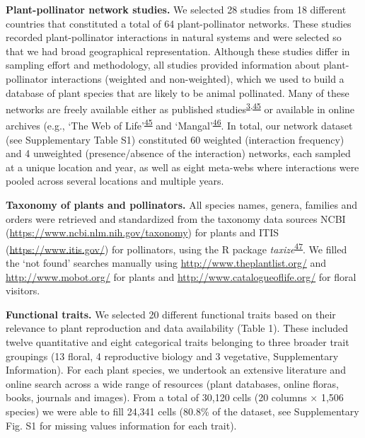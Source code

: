\documentclass[12pt,a4paper,]{article}
\begin{document}
\textbf{Plant-pollinator network studies.} We selected 28 studies from
18 different countries that constituted a total of 64 plant-pollinator
networks. These studies recorded plant-pollinator interactions in
natural systems and were selected so that we had broad geographical
representation. Although these studies differ in sampling effort and
methodology, all studies provided information about plant-pollinator
interactions (weighted and non-weighted), which we used to build a
database of plant species that are likely to be animal pollinated. Many
of these networks are freely available either as published
studies\textsuperscript{\protect\hyperlink{ref-carvalheiro2014}{3},\protect\hyperlink{ref-fortuna2010}{45}}
or available in online archives (e.g., `The Web of
Life'\textsuperscript{\protect\hyperlink{ref-fortuna2010}{45}} and
`Mangal'\textsuperscript{\protect\hyperlink{ref-poisot2016}{46}}. In
total, our network dataset (see Supplementary Table S1) constituted 60
weighted (interaction frequency) and 4 unweighted (presence/absence of
the interaction) networks, each sampled at a unique location and year,
as well as eight meta-webs where interactions were pooled across several
locations and multiple years.

\textbf{Taxonomy of plants and pollinators.} All species names, genera,
families and orders were retrieved and standardized from the taxonomy
data sources NCBI (\url{https://www.ncbi.nlm.nih.gov/taxonomy}) for
plants and ITIS (\url{https://www.itis.gov/}) for pollinators, using the
R package
\emph{taxize}\textsuperscript{\protect\hyperlink{ref-chamberlain2020}{47}}.
We filled the `not found' searches manually using
\url{http://www.theplantlist.org/} and \url{http://www.mobot.org/} for
plants and \url{http://www.catalogueoflife.org/} for floral visitors.

\textbf{Functional traits.} We selected 20 different functional traits
based on their relevance to plant reproduction and data availability
(Table 1). These included twelve quantitative and eight categorical
traits belonging to three broader trait groupings (13 floral, 4
reproductive biology and 3 vegetative, Supplementary Information). For
each plant species, we undertook an extensive literature and online
search across a wide range of resources (plant databases, online floras,
books, journals and images). From a total of 30,120 cells (20 columns ×
1,506 species) we were able to fill 24,341 cells (80.8\% of the dataset,
see Supplementary Fig. S1 for missing values information for each
trait).
\end{document}
